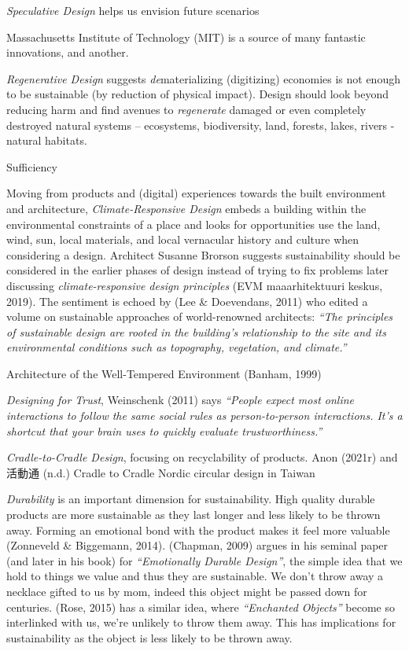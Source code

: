\documentclass[
  letterpaper,
  DIV=11,
  numbers=noendperiod]{scrartcl}
\begin{document}
\emph{Speculative Design} helps us envision future scenarios

Massachusetts Institute of Technology (MIT) is a source of many
fantastic innovations, and another.

\emph{Regenerative Design} suggests \emph{de}materializing (digitizing)
economies is not enough to be sustainable (by reduction of physical
impact). Design should look beyond reducing harm and find avenues to
\emph{regenerate} damaged or even completely destroyed natural systems
-- ecosystems, biodiversity, land, forests, lakes, rivers - natural
habitats.

Sufficiency

Moving from products and (digital) experiences towards the built
environment and architecture, \emph{Climate-Responsive Design} embeds a
building within the environmental constraints of a place and looks for
opportunities use the land, wind, sun, local materials, and local
vernacular history and culture when considering a design. Architect
Susanne Brorson suggests sustainability should be considered in the
earlier phases of design instead of trying to fix problems later
discussing \emph{climate-responsive design principles} (EVM
maaarhitektuuri keskus, 2019). The sentiment is echoed by (Lee \&
Doevendans, 2011) who edited a volume on sustainable approaches of
world-renowned architects: \emph{``The principles of sustainable design
are rooted in the building's relationship to the site and its
environmental conditions such as topography, vegetation, and climate.''}

Architecture of the Well-Tempered Environment (Banham, 1999)

\emph{Designing for Trust}, Weinschenk (2011) says \emph{``People expect
most online interactions to follow the same social rules as
person-to-person interactions. It's a shortcut that your brain uses to
quickly evaluate trustworthiness.''}

\emph{Cradle-to-Cradle Design}, focusing on recyclability of products.
Anon (2021r) and 活動通 (n.d.) Cradle to Cradle Nordic circular design
in Taiwan

\emph{Durability} is an important dimension for sustainability. High
quality durable products are more sustainable as they last longer and
less likely to be thrown away. Forming an emotional bond with the
product makes it feel more valuable (Zonneveld \& Biggemann, 2014).
(Chapman, 2009) argues in his seminal paper (and later in his book) for
\emph{``Emotionally Durable Design''}, the simple idea that we hold to
things we value and thus they are sustainable. We don't throw away a
necklace gifted to us by mom, indeed this object might be passed down
for centuries. (Rose, 2015) has a similar idea, where \emph{``Enchanted
Objects''} become so interlinked with us, we're unlikely to throw them
away. This has implications for sustainability as the object is less
likely to be thrown away.
\end{document}
